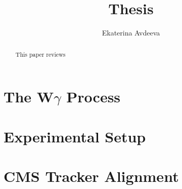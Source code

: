 \documentclass{article}
\begin{document}
 
\pagenumbering{}
\title{\textbf{Thesis}}

\author{Ekaterina Avdeeva}

\maketitle

\begin{abstract}
This paper reviews
\end{abstract}




\pagestyle{fancy}
\fancyhf{}
\lhead[]{\thepage}
\rhead[\thepage]{}

\tableofcontents
\linespread{1.5}

%








\section{The W$\gamma$ Process} %
\label{sec:WgAbout}




\section{Experimental Setup} %
\label{sec:Exp}
%
%

\section{CMS Tracker Alignment} %
\label{sec:alignment}
%
%
%

%
%
%
%
%
%
%




\end{document}
